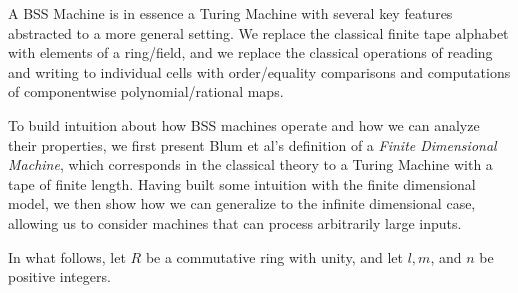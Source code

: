 A BSS Machine is in essence a Turing Machine with several key features
abstracted to a more general setting. We replace the classical finite
tape alphabet with elements of a ring/field, and we replace the
classical operations of reading and writing to individual cells with
order/equality comparisons and computations of componentwise
polynomial/rational maps.
 
To build intuition about how BSS machines operate and how we can
analyze their properties, we first present Blum et al's definition of
a \emph{Finite Dimensional Machine}, which corresponds in the
classical theory to a Turing Machine with a tape of finite length.
Having built some intuition with the finite dimensional model, we then
show how we can generalize to the infinite dimensional case, allowing
us to consider machines that can process arbitrarily large inputs.

In what follows, let $R$ be a commutative ring with unity, and let $l,
m$, and $n$ be positive integers.

